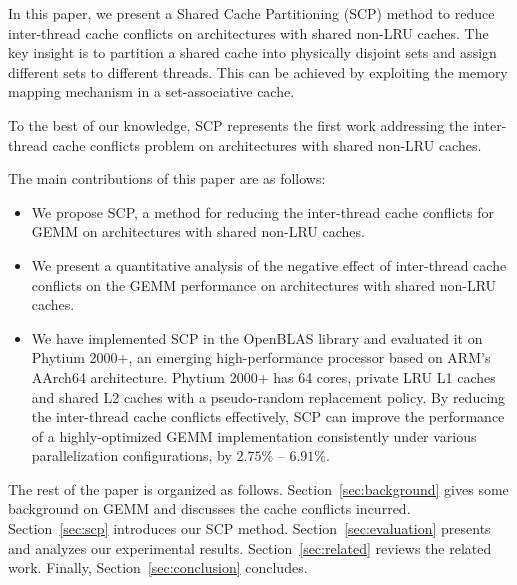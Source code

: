 In this paper, we present a Shared Cache Partitioning (SCP) method
to reduce inter-thread cache conflicts on architectures with shared non-LRU caches.
The key insight is to partition a
shared cache into physically disjoint sets
and assign different sets to different threads. This can be achieved by
exploiting the memory mapping mechanism in a 
set-associative cache.

To the best of our knowledge, SCP represents
the first work addressing
the inter-thread cache conflicts problem on
architectures with shared non-LRU caches.

The main contributions of this paper are as follows:
\begin{itemize}
\item We propose SCP, a method for reducing 
	the inter-thread cache conflicts
  for GEMM on architectures with shared non-LRU caches.
\item We present a quantitative analysis of the negative effect of inter-thread cache
  conflicts on the GEMM performance
  on architectures with shared non-LRU caches.
\item We have implemented SCP in the OpenBLAS library and evaluated it on Phytium 2000+,
  an emerging high-performance processor based on ARM's AArch64 architecture.
  Phytium 2000+ has 64 cores, private LRU L1 caches
  and shared L2 caches with a pseudo-random
  replacement policy. By reducing the inter-thread
  cache conflicts effectively,
  SCP can improve the 
  performance of a highly-optimized
  GEMM implementation  consistently
  under various parallelization configurations, by 
  $2.75\%$ -- $6.91\%$.
\end{itemize}


The rest of the paper is organized as follows.
Section~\ref{sec:background} gives some background on GEMM and discusses
the cache conflicts incurred.
Section~\ref{sec:scp} introduces our SCP method.
Section~\ref{sec:evaluation} presents and
analyzes our experimental results.
Section~\ref{sec:related} reviews the related work.
Finally, Section~\ref{sec:conclusion} concludes.
